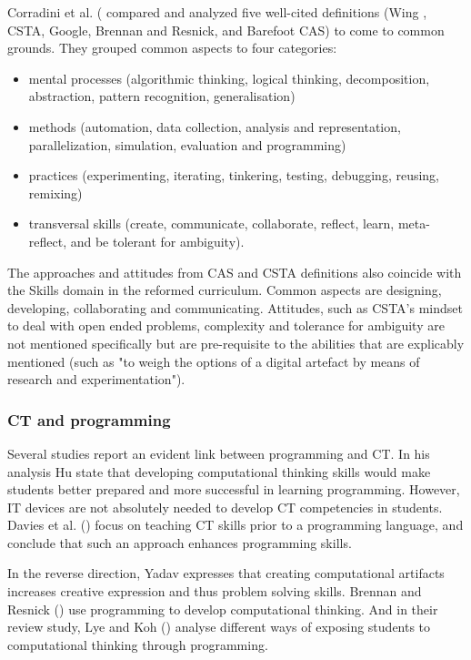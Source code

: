 Corradini et al. (\cite{corradini2017conceptions}
compared and analyzed five well-cited definitions (Wing \cite{Wing2006}, CSTA\cite{CSTA2011CT}, Google\cite{Google2017CT}, Brennan and Resnick\cite{BrennanResnick2012}, and Barefoot CAS\cite{CAS2014CT}) to come to common grounds. They grouped common aspects to four categories:
\begin{itemize}
\item mental processes (algorithmic thinking, logical thinking, decomposition, abstraction, pattern recognition, generalisation)
\item methods (automation, data collection, analysis and representation, parallelization, simulation, evaluation and programming)
\item practices (experimenting, iterating, tinkering, testing, debugging, reusing, remixing)
\item transversal skills (create, communicate, collaborate, reflect, learn, meta-reflect, and be tolerant for ambiguity).
\end{itemize}

The approaches and attitudes from CAS and CSTA definitions also coincide with the Skills domain in the reformed curriculum. Common aspects are designing, developing, collaborating and communicating. Attitudes, such as CSTA's mindset to deal with open ended problems, complexity and tolerance for ambiguity are not mentioned specifically but are pre-requisite to the abilities that are explicably mentioned (such as "to weigh the options of a digital artefact by means of research and experimentation").



\subsubsection{CT and programming}

Several studies report an evident link between programming and CT. In his analysis Hu \cite{hu2011computational} state that developing computational thinking skills would make students better prepared and more successful in learning programming. However, IT devices are not absolutely needed to develop CT competencies in students\cite{corradini2017conceptions}. Davies et al. (\cite{davies2008effects}) focus on teaching CT skills prior to a programming language, and conclude that such an approach enhances programming skills.

In the reverse direction, Yadav \cite{Yadav2017CTteacherEd} expresses that creating computational artifacts increases creative expression and thus problem solving skills. Brennan and Resnick (\cite{BrennanResnick2012}) use programming to develop computational thinking. And in their review study, Lye and Koh (\cite{LyeKoh2014}) analyse different ways of exposing students to computational thinking through programming.


